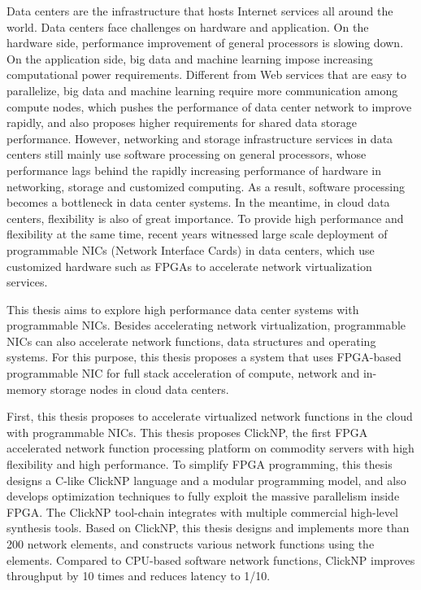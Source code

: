 \begin{enabstract}
	
Data centers are the infrastructure that hosts Internet services all around the world.
Data centers face challenges on hardware and application.
On the hardware side, performance improvement of general processors is slowing down.
On the application side, big data and machine learning impose increasing computational power requirements.
Different from Web services that are easy to parallelize, big data and machine learning require more communication among compute nodes, which pushes the performance of data center network to improve rapidly, and also proposes higher requirements for shared data storage performance.
However, networking and storage infrastructure services in data centers still mainly use software processing on general processors, whose performance lags behind the rapidly increasing performance of hardware in networking, storage and customized computing.
As a result, software processing becomes a bottleneck in data center systems.
In the meantime, in cloud data centers, flexibility is also of great importance.
To provide high performance and flexibility at the same time, recent years witnessed large scale deployment of programmable NICs (Network Interface Cards) in data centers, which use customized hardware such as FPGAs to accelerate network virtualization services.

This thesis aims to explore high performance data center systems with programmable NICs.
Besides accelerating network virtualization, programmable NICs can also accelerate network functions, data structures and operating systems.
For this purpose, this thesis proposes a system that uses FPGA-based programmable NIC for full stack acceleration of compute, network and in-memory storage nodes in cloud data centers.

First, this thesis proposes to accelerate virtualized network functions in the cloud with programmable NICs. This thesis proposes ClickNP, the first FPGA accelerated network function processing platform on commodity servers with high flexibility and high performance.
To simplify FPGA programming, this thesis designs a C-like ClickNP language and a modular programming model, and also develops optimization techniques to fully exploit the massive parallelism inside FPGA.
The ClickNP tool-chain integrates with multiple commercial high-level synthesis tools.
Based on ClickNP, this thesis designs and implements more than 200 network elements, and constructs various network functions using the elements.
Compared to CPU-based software network functions, ClickNP improves throughput by 10 times and reduces latency to 1/10.


\end{enabstract}

